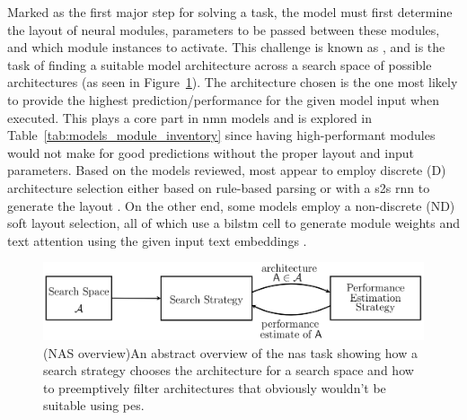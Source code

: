 Marked as the first major step for solving a task, the model must first determine the layout of neural modules, parameters to be passed between these modules, and which module instances to activate.
This challenge is known as , and is the task of finding a suitable model architecture across a search space of possible architectures (as seen in Figure~\ref{fig:neural_architecture_search_overview})\cite{elsken_neural_2019}.
The architecture chosen is the one most likely to provide the highest prediction/performance for the given model input when executed.
This plays a core part in \gls{nmn} models and is explored in Table~\ref{tab:models_module_inventory} since having high-performant modules would not make for good predictions without the proper layout and input parameters.
Based on the models reviewed, most appear to employ discrete (D) architecture selection either based on rule-based parsing \cite{andreas_neural_2016,chen_meta_2020} or with a \gls{s2s} \gls{rnn} to generate the layout \cite{hu_learning_2017,chen_teaching_2022,su_toward_2020,kottur_visual_2018,cho_visual_2021}.
On the other end, some models employ a non-discrete (ND) soft layout selection, all of which use a \gls{bilstm} cell to generate module weights and text attention using the given input text embeddings \cite{hu_explainable_2019,hudson_compositional_2018,pahuja_learning_2019}.

\begin{figure}[htbp]
    \centering
    \includegraphics[width=\textwidth,keepaspectratio]{content/chapters/literature_review/discussion/figures/neural_architecture_search_overview.png}
    \captionsource(NAS overview){An abstract overview of the \acrshort{nas} task showing how a search strategy chooses the architecture for a search space and how to preemptively filter architectures that obviously wouldn't be suitable using \acrshort{pes}.\label{fig:neural_architecture_search_overview}}{\citeauthor{elsken_neural_2019}\cite{elsken_neural_2019}}
\end{figure}

